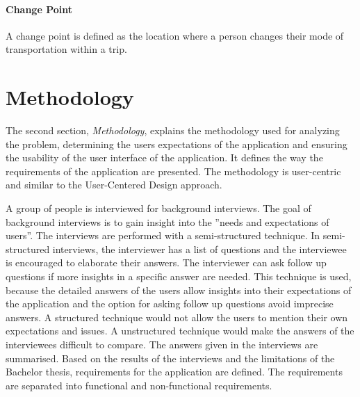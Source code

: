 \paragraph{Change Point} A change point is defined as the location where a person changes their mode of transportation within a trip. \cite{Zheng2008}

\section{Methodology}
The second section, \textit{Methodology}, explains the methodology used for analyzing the problem, determining the users expectations of the application and ensuring the usability of the user interface of the application. It defines the way the requirements of the application are presented. The methodology is user-centric and similar to the User-Centered Design approach. 

A group of people is interviewed for background interviews. The goal of background interviews is to gain insight into the ''needs and expectations of users''. The interviews are performed with a semi-structured technique. In semi-structured interviews, the interviewer has a list of questions and the interviewee is encouraged to elaborate their answers. The interviewer can ask follow up questions if more insights in a specific answer are needed. This technique is used, because the detailed answers of the users allow insights into their expectations of the application and the option for asking follow up questions avoid imprecise answers. A structured technique would not allow the users to mention their own expectations and issues. A unstructured technique would make the answers of the interviewees difficult to compare. The answers given in the interviews are summarised. Based on the results of the interviews and the limitations of the Bachelor thesis, requirements for the application are defined. The requirements are separated into functional and non-functional requirements. \cite{Abras2004} \cite{wilson2013interview}

